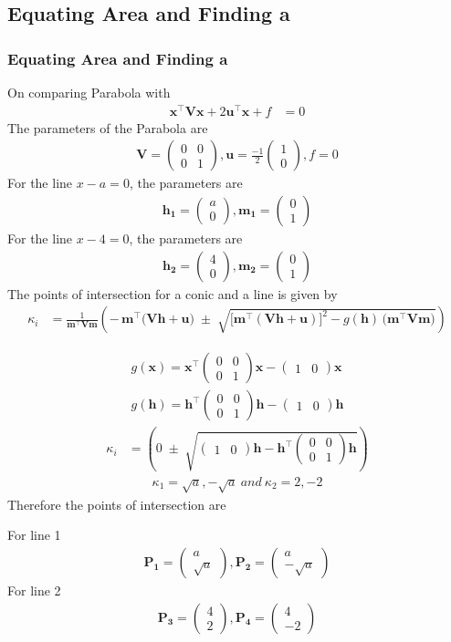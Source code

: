\documentclass{beamer}
\theoremstyle{remark}
\newcommand{\myvec}[1]{\ensuremath{\begin{pmatrix}#1\end{pmatrix}}}
\let\vec\mathbf
\numberwithin{equation}{section}
\begin{document}
\subsection{Equating Area and Finding a}
\begin{frame}
\frametitle{Equating Area and Finding a}
On comparing Parabola  with
\begin{align}
\vec{x}^\top\vec{V}\vec{x} + 2\vec{u}^\top\vec{x} + f &= 0 
\end{align}
The parameters of the Parabola are 
\begin{align}
\vec{V}=\myvec{0&0\\0&1} , \vec{u}=\frac{-1}{2}\myvec{1\\0} , f=0
\end{align}
For the line $x-a = 0$, the parameters are 
\begin{align}
\vec{h_1}=\myvec{a\\0} , \vec{m_1}=\myvec{0\\1}
\end{align}
For the line $x-4 = 0$, the parameters are
\begin{align}
\vec{h_2}=\myvec{4\\0} , \vec{m_2}=\myvec{0\\1}
\end{align}
The points of intersection for a conic and a line is given by
\begin{align}
\kappa_i
  &= \frac{1}{\vec{m}^\top \vec{V}\vec{m}}
     \left(
       -\,\vec{m}^\top\big(\vec{V}\vec{h}+\vec{u}\big)
       \;\pm\;
       \sqrt{ \big[\vec{m}^\top(\vec{V}\vec{h}+\vec{u})\big]^2
       - g(\vec{h})\,\big(\vec{m}^\top \vec{V}\vec{m}\big)}
     \right)
\end{align}
\end{frame}
\begin{frame}
\begin{align}
g(\vec{x}) = \vec{x}^\top\myvec{0&0\\0&1}\vec{x} - \myvec{1 & 0}\vec{x} \\
g(\vec{h}) = \vec{h}^\top\myvec{0&0\\0&1}\vec{h} - \myvec{1 & 0}\vec{h}
\end{align}
\begin{align}
\kappa_i &=\left(
            0
       \;\pm\;
       \sqrt{\myvec{1 & 0}\vec{h} - \vec{h}^\top\myvec{0&0\\0&1}\vec{h}}
     \right)
\end{align}
\begin{align}
\kappa_1 = \sqrt{a} , -\sqrt{a} \ and \ \kappa_2 = 2 , -2
\end{align}
Therefore the points of intersection are 

For line 1
\begin{align}
\vec{P_1} = \myvec{a \\ \sqrt{a}} , \vec{P_2} = \myvec{a \\ -\sqrt{a}}
\end{align}
For line 2
\begin{align}
\vec{P_3} = \myvec{4 \\ 2} , \vec{P_4} = \myvec{4 \\ -2}
\end{align}
\end{frame}
\end{document}
